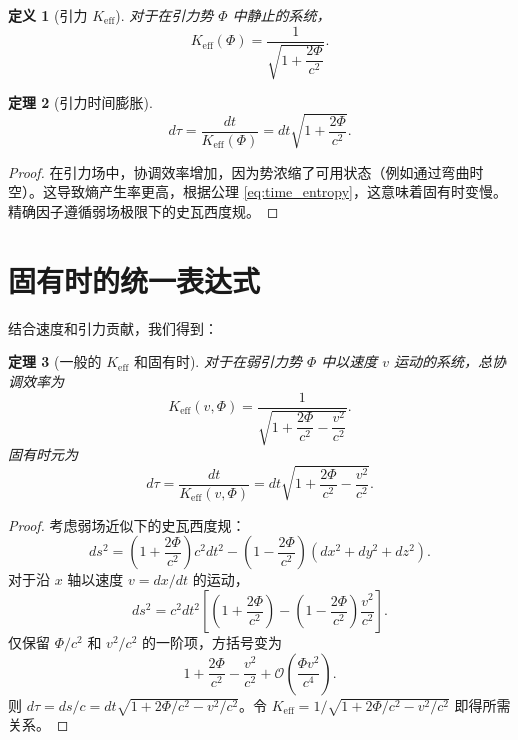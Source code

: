 \documentclass[12pt,a4paper]{article}
\newtheorem{theorem}{定理}[section]
\newtheorem{definition}[theorem]{定义}
\newcommand{\Keff}{K_{\mathrm{eff}}}
\begin{document}
	\begin{definition}[引力 \(\Keff\)]
		对于在引力势 \(\Phi\) 中静止的系统，
		\[
		\Keff(\Phi) = \frac{1}{\sqrt{1 + \dfrac{2\Phi}{c^2}}}.
		\]
	\end{definition}
	
	\begin{theorem}[引力时间膨胀]
		\begin{equation}
			d\tau = \frac{dt}{\Keff(\Phi)} = dt\sqrt{1 + \frac{2\Phi}{c^2}}.
		\end{equation}
	\end{theorem}
	
	\begin{proof}
		在引力场中，协调效率增加，因为势浓缩了可用状态（例如通过弯曲时空）。这导致熵产生率更高，根据公理 \ref{eq:time_entropy}，这意味着固有时变慢。精确因子遵循弱场极限下的史瓦西度规。
	\end{proof}
	
	\section{固有时的统一表达式}
	\label{sec:unified}
	
	结合速度和引力贡献，我们得到：
	
	\begin{theorem}[一般的 \(\Keff\) 和固有时]
		对于在弱引力势 \(\Phi\) 中以速度 \(v\) 运动的系统，总协调效率为
		\begin{equation}
			\Keff(v,\Phi) = \frac{1}{\sqrt{1 + \dfrac{2\Phi}{c^2} - \dfrac{v^2}{c^2}}}.
		\end{equation}
		固有时元为
		\begin{equation}
			d\tau = \frac{dt}{\Keff(v,\Phi)} = dt\sqrt{1 + \frac{2\Phi}{c^2} - \frac{v^2}{c^2}}.
		\end{equation}
	\end{theorem}
	
	\begin{proof}
		考虑弱场近似下的史瓦西度规：
		\[
		ds^2 = \left(1+\frac{2\Phi}{c^2}\right)c^2 dt^2 - \left(1-\frac{2\Phi}{c^2}\right)(dx^2+dy^2+dz^2).
		\]
		对于沿 \(x\) 轴以速度 \(v = dx/dt\) 的运动，
		\[
		ds^2 = c^2 dt^2\left[ \left(1+\frac{2\Phi}{c^2}\right) - \left(1-\frac{2\Phi}{c^2}\right)\frac{v^2}{c^2} \right].
		\]
		仅保留 \(\Phi/c^2\) 和 \(v^2/c^2\) 的一阶项，方括号变为
		\[
		1 + \frac{2\Phi}{c^2} - \frac{v^2}{c^2} + \mathcal{O}\left(\frac{\Phi v^2}{c^4}\right).
		\]
		则 \(d\tau = ds/c = dt\sqrt{1 + 2\Phi/c^2 - v^2/c^2}\)。令 \(\Keff = 1/\sqrt{1 + 2\Phi/c^2 - v^2/c^2}\) 即得所需关系。
	\end{proof}
	
\end{document}
